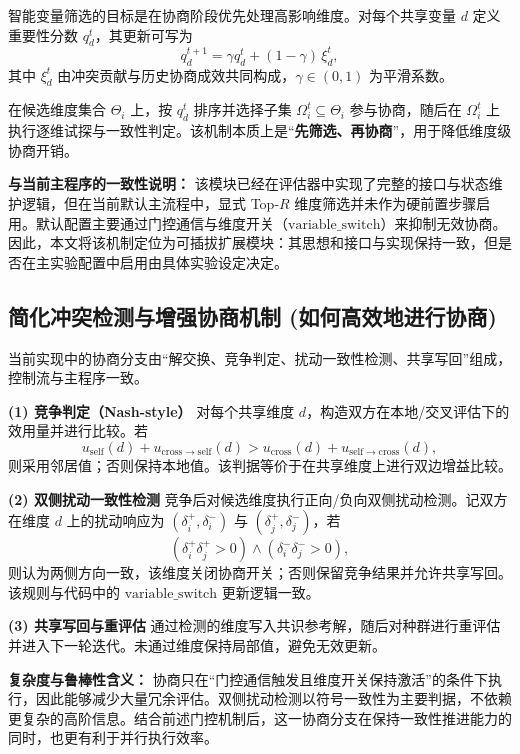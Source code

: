 \documentclass[conference]{IEEEtran}
\begin{document}
智能变量筛选的目标是在协商阶段优先处理高影响维度。对每个共享变量 \(d\) 定义重要性分数 \(q_d^t\)，其更新可写为
\[
q_d^{t+1}=\gamma q_d^t+(1-\gamma)\,\xi_d^t,
\]
其中 \(\xi_d^t\) 由冲突贡献与历史协商成效共同构成，\(\gamma\in(0,1)\) 为平滑系数。

在候选维度集合 \(\Theta_i\) 上，按 \(q_d^t\) 排序并选择子集 \(\Omega_i^t\subseteq\Theta_i\) 参与协商，随后在 \(\Omega_i^t\) 上执行逐维试探与一致性判定。该机制本质上是“\textbf{先筛选、再协商}”，用于降低维度级协商开销。

\textbf{与当前主程序的一致性说明：}
该模块已经在评估器中实现了完整的接口与状态维护逻辑，但在当前默认主流程中，显式 Top-$R$ 维度筛选并未作为硬前置步骤启用。默认配置主要通过门控通信与维度开关（$\mathrm{variable\_switch}$）来抑制无效协商。因此，本文将该机制定位为可插拔扩展模块：其思想和接口与实现保持一致，但是否在主实验配置中启用由具体实验设定决定。

\subsection{简化冲突检测与增强协商机制 (如何高效地进行协商)}\label{ux7b80ux5316ux51b2ux7a81ux68c0ux6d4bux4e0eux589eux5f3aux534fux5546ux673aux5236-ux5982ux4f55ux9ad8ux6548ux5730ux8fdbux884cux534fux5546}

当前实现中的协商分支由“解交换、竞争判定、扰动一致性检测、共享写回”组成，控制流与主程序一致。

\textbf{(1) 竞争判定（Nash-style）}  
对每个共享维度 \(d\)，构造双方在本地/交叉评估下的效用量并进行比较。若
\[
u_{\mathrm{self}}(d)+u_{\mathrm{cross}\rightarrow\mathrm{self}}(d)
>
u_{\mathrm{cross}}(d)+u_{\mathrm{self}\rightarrow\mathrm{cross}}(d),
\]
则采用邻居值；否则保持本地值。该判据等价于在共享维度上进行双边增益比较。

\textbf{(2) 双侧扰动一致性检测}  
竞争后对候选维度执行正向/负向双侧扰动检测。记双方在维度 \(d\) 上的扰动响应为
\((\delta_i^+,\delta_i^-)\) 与 \((\delta_j^+,\delta_j^-)\)，若
\[
(\delta_i^+\delta_j^+>0)\land(\delta_i^-\delta_j^->0),
\]
则认为两侧方向一致，该维度关闭协商开关；否则保留竞争结果并允许共享写回。该规则与代码中的 \(\mathrm{variable\_switch}\) 更新逻辑一致。

\textbf{(3) 共享写回与重评估}  
通过检测的维度写入共识参考解，随后对种群进行重评估并进入下一轮迭代。未通过维度保持局部值，避免无效更新。

\textbf{复杂度与鲁棒性含义：}
协商只在“门控通信触发且维度开关保持激活”的条件下执行，因此能够减少大量冗余评估。双侧扰动检测以符号一致性为主要判据，不依赖更复杂的高阶信息。结合前述门控机制后，这一协商分支在保持一致性推进能力的同时，也更有利于并行执行效率。
\end{document}
